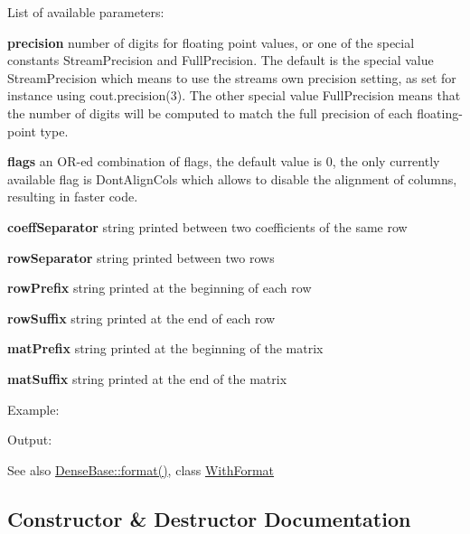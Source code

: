 List of available parameters\+:
\begin{DoxyItemize}
\item {\bfseries{precision}} number of digits for floating point values, or one of the special constants {\ttfamily Stream\+Precision} and {\ttfamily Full\+Precision}. The default is the special value {\ttfamily Stream\+Precision} which means to use the stream\textquotesingle{}s own precision setting, as set for instance using {\ttfamily cout.\+precision(3)}. The other special value {\ttfamily Full\+Precision} means that the number of digits will be computed to match the full precision of each floating-\/point type.
\item {\bfseries{flags}} an O\+R-\/ed combination of flags, the default value is 0, the only currently available flag is {\ttfamily Dont\+Align\+Cols} which allows to disable the alignment of columns, resulting in faster code.
\item {\bfseries{coeff\+Separator}} string printed between two coefficients of the same row
\item {\bfseries{row\+Separator}} string printed between two rows
\item {\bfseries{row\+Prefix}} string printed at the beginning of each row
\item {\bfseries{row\+Suffix}} string printed at the end of each row
\item {\bfseries{mat\+Prefix}} string printed at the beginning of the matrix
\item {\bfseries{mat\+Suffix}} string printed at the end of the matrix
\end{DoxyItemize}

Example\+: 
\begin{DoxyCodeInclude}{0}
\end{DoxyCodeInclude}
 Output\+: 
\begin{DoxyVerbInclude}
\end{DoxyVerbInclude}


\begin{DoxySeeAlso}{See also}
\mbox{\hyperlink{class_eigen_1_1_dense_base_ab231f1a6057f28d4244145e12c9fc0c7}{Dense\+Base\+::format()}}, class \mbox{\hyperlink{class_eigen_1_1_with_format}{With\+Format}} 
\end{DoxySeeAlso}


\subsection{Constructor \& Destructor Documentation}
\mbox{\label{struct_eigen_1_1_i_o_format_a840cac6401adc4de421260d63dc3d861}} 
